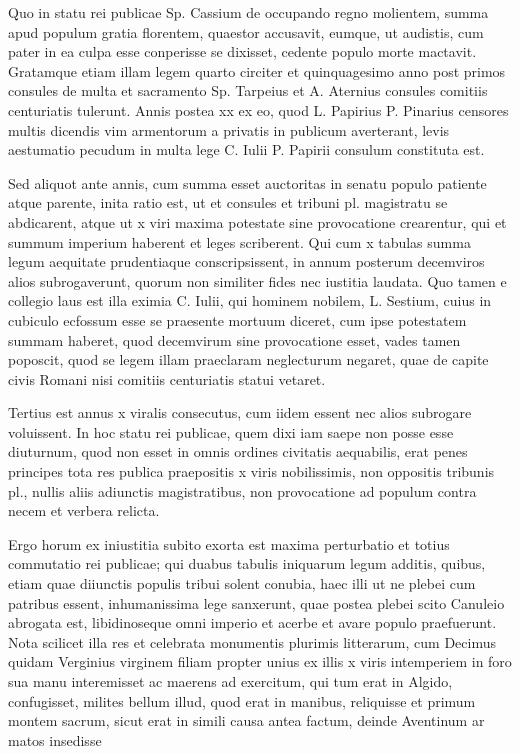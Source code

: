  Quo in statu rei publicae Sp. Cassium de occupando regno molientem, summa apud populum gratia florentem, quaestor accusavit, eumque, ut audistis, cum pater in ea culpa esse conperisse se dixisset, cedente populo morte mactavit. Gratamque etiam illam legem quarto circiter et quinquagesimo anno post primos consules de multa et sacramento Sp. Tarpeius et A. Aternius consules comitiis centuriatis tulerunt. Annis postea xx ex eo, quod L. Papirius P. Pinarius censores multis dicendis vim armentorum a privatis in publicum averterant, levis aestumatio pecudum in multa lege C. Iulii P. Papirii consulum constituta est.

 Sed aliquot ante annis, cum summa esset auctoritas in senatu populo patiente atque parente, inita ratio est, ut et consules et tribuni pl. magistratu se abdicarent, atque ut x viri maxima potestate sine provocatione crearentur, qui et summum imperium haberent et leges scriberent. Qui cum x tabulas summa legum aequitate prudentiaque conscripsissent, in annum posterum decemviros alios subrogaverunt, quorum non similiter fides nec iustitia laudata. Quo tamen e collegio laus est illa eximia C. Iulii, qui hominem nobilem, L. Sestium, cuius in cubiculo ecfossum esse se praesente mortuum diceret, cum ipse potestatem summam haberet, quod decemvirum sine provocatione esset, vades tamen poposcit, quod se legem illam praeclaram neglecturum negaret, quae de capite civis Romani nisi comitiis centuriatis statui vetaret.

 Tertius est annus x viralis consecutus, cum iidem essent nec alios subrogare voluissent. In hoc statu rei publicae, quem dixi iam saepe non posse esse diuturnum, quod non esset in omnis ordines civitatis aequabilis, erat penes principes tota res publica praepositis x viris nobilissimis, non oppositis tribunis pl., nullis aliis adiunctis magistratibus, non provocatione ad populum contra necem et verbera relicta.

 Ergo horum ex iniustitia subito exorta est maxima perturbatio et totius commutatio rei publicae; qui duabus tabulis iniquarum legum additis, quibus, etiam quae diiunctis populis tribui solent conubia, haec illi ut ne plebei cum patribus essent, inhumanissima lege sanxerunt, quae postea plebei scito Canuleio abrogata est, libidinoseque omni imperio et acerbe et avare populo praefuerunt. Nota scilicet illa res et celebrata monumentis plurimis litterarum, cum Decimus quidam Verginius virginem filiam propter unius ex illis x viris intemperiem in foro sua manu interemisset ac maerens ad exercitum, qui tum erat in Algido, confugisset, milites bellum illud, quod erat in manibus, reliquisse et primum montem sacrum, sicut erat in simili causa antea factum, deinde Aventinum ar matos insedisse

